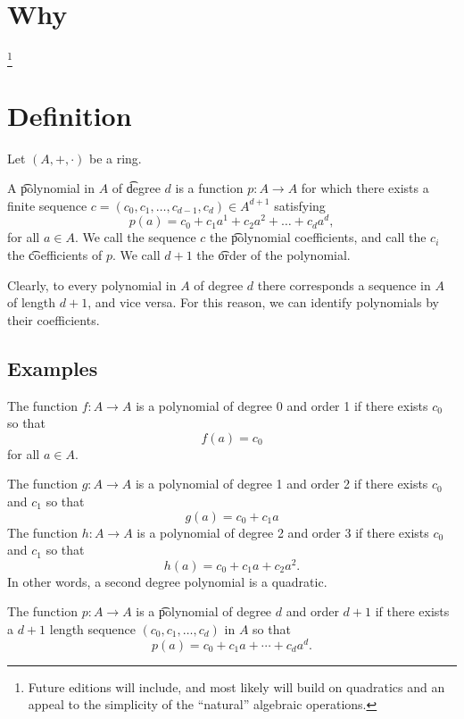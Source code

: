 

\section*{Why}

\footnote{Future editions will include, and most likely will build on quadratics and an appeal to the simplicity of the ``natural'' algebraic operations.}

\section*{Definition}

Let $(A, +, \cdot )$ be a ring.

A \t{polynomial} in $A$ of \t{degree} $d$ is a function $p: A \to A$ for which there exists a finite sequence $c = (c_0, c_1, \dots , c_{d-1}, c_d) \in A^{d+1}$ satisfying
\[
p(a) = c_0 + c_1a^1 + c_2a^2 + \dots  + c_da^d,
\]
for all $a \in A$.
We call the sequence $c$ the \t{polynomial coefficients}, and call the $c_i$ the \t{coefficients} of $p$.
We call $d+1$ the \t{order} of the polynomial.

Clearly, to every polynomial in $A$ of degree $d$ there corresponds a sequence in $A$ of length $d+1$, and vice versa.
For this reason, we can identify polynomials by their coefficients.

\subsection*{Examples}

The function $f: A \to A$ is a polynomial of degree 0 and order 1 if there exists $c_0$ so that
\[
f(a) = c_0
\]
for all $a \in A$.

The function $g: A \to A$ is a polynomial of degree 1 and order 2 if there exists $c_0$ and $c_1$ so that
\[
g(a) = c_0 + c_1a
\]
The function $h: A \to A$ is a polynomial of degree 2 and order 3 if there exists $c_0$ and $c_1$ so that
\[
h(a) = c_0 + c_1a + c_2a^2.
\]
In other words, a second degree polynomial is a quadratic.

The function $p: A \to A$ is a \t{polynomial} of degree $d$ and order $d+1$ if there exists a $d+1$ length sequence $(c_0, c_1, \dots , c_d)$ in $A$ so that
\[
p(a) = c_0 + c_1a + \cdots + c_da^d.
\]

\blankpage